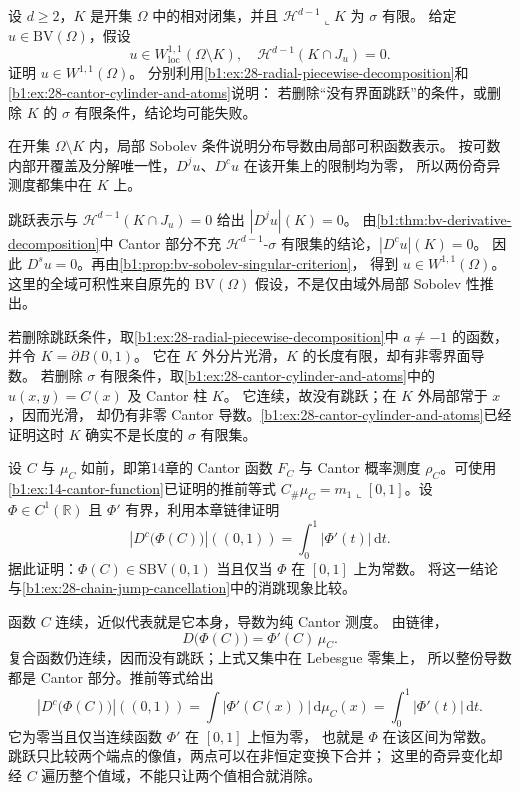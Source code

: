 \begin{exercise}\label{b1:ex:28-bv-removable-interface}
设 \(d\ge2\)，\(K\) 是开集 \(\Omega\) 中的相对闭集，并且
\(\mathcal H^{d-1}\llcorner K\) 为 \(\sigma\) 有限。
给定 \(u\in \mathrm{BV}(\Omega)\)，假设
\[
 u\in W_{\mathrm{loc}}^{1,1}(\Omega\setminus K),
 \quad \mathcal H^{d-1}(K\cap J_u)=0.
\]
证明 \(u\in W^{1,1}(\Omega)\)。
分别利用\cref{b1:ex:28-radial-piecewise-decomposition}和%
\cref{b1:ex:28-cantor-cylinder-and-atoms}说明：
若删除“没有界面跳跃”的条件，或删除 \(K\) 的 \(\sigma\) 有限条件，结论均可能失败。
\end{exercise}
\begin{solution}
在开集 \(\Omega\setminus K\) 内，局部 Sobolev 条件说明分布导数由局部可积函数表示。
按可数内部开覆盖及分解唯一性，\(D^ju\)、\(D^cu\) 在该开集上的限制均为零，
所以两份奇异测度都集中在 \(K\) 上。

跳跃表示与 \(\mathcal H^{d-1}(K\cap J_u)=0\) 给出 \(|D^ju|(K)=0\)。
由\cref{b1:thm:bv-derivative-decomposition}中 Cantor 部分不充
\(\mathcal H^{d-1}\)-\(\sigma\) 有限集的结论，\(|D^cu|(K)=0\)。
因此 \(D^su=0\)。再由\cref{b1:prop:bv-sobolev-singular-criterion}，
得到 \(u\in W^{1,1}(\Omega)\)。
这里的全域可积性来自原先的 \(\mathrm{BV}(\Omega)\) 假设，不是仅由域外局部 Sobolev 性推出。

若删除跳跃条件，取\cref{b1:ex:28-radial-piecewise-decomposition}中 \(a\ne-1\) 的函数，并令 \(K=\partial B(0,1)\)。
它在 \(K\) 外分片光滑，\(K\) 的长度有限，却有非零界面导数。
若删除 \(\sigma\) 有限条件，取\cref{b1:ex:28-cantor-cylinder-and-atoms}中的 \(u(x,y)=C(x)\) 及 Cantor 柱 \(K\)。
它连续，故没有跳跃；在 \(K\) 外局部常于 \(x\)，因而光滑，
却仍有非零 Cantor 导数。\cref{b1:ex:28-cantor-cylinder-and-atoms}已经证明这时 \(K\) 确实不是长度的 \(\sigma\) 有限集。
\end{solution}

\begin{exercise}\label{b1:ex:28-cantor-reparameterization}
设 \(C\) 与 \(\mu_C\) 如前，即第14章的 Cantor 函数 \(F_C\) 与 Cantor 概率测度 \(\rho_C\)。可使用\cref{b1:ex:14-cantor-function}已证明的推前等式 \(C_\#\mu_C=m_1\llcorner[0,1]\)。设 \(\Phi\in C^1(\mathbb R)\) 且 \(\Phi'\) 有界，利用本章链律证明
\[
 |D^c\bigl(\Phi(C)\bigr)|((0,1))=\int_0^1|\Phi'(t)|\,\mathrm dt.
\]
据此证明：\(\Phi(C)\in \mathrm{SBV}(0,1)\) 当且仅当 \(\Phi\) 在 \([0,1]\) 上为常数。
将这一结论与\cref{b1:ex:28-chain-jump-cancellation}中的消跳现象比较。
\end{exercise}
\begin{solution}
函数 \(C\) 连续，近似代表就是它本身，导数为纯 Cantor 测度。
由链律，
\[
 D\bigl(\Phi(C)\bigr)=\Phi'(C)\,\mu_C.
\]
复合函数仍连续，因而没有跳跃；上式又集中在 Lebesgue 零集上，
所以整份导数都是 Cantor 部分。推前等式给出
\[
 |D^c\bigl(\Phi(C)\bigr)|((0,1))
 =\int|\Phi'(C(x))|\,\mathrm d\mu_C(x)
 =\int_0^1|\Phi'(t)|\,\mathrm dt.
\]
它为零当且仅当连续函数 \(\Phi'\) 在 \([0,1]\) 上恒为零，
也就是 \(\Phi\) 在该区间为常数。
跳跃只比较两个端点的像值，两点可以在非恒定变换下合并；
这里的奇异变化却经 \(C\) 遍历整个值域，不能只让两个值相合就消除。
\end{solution}

